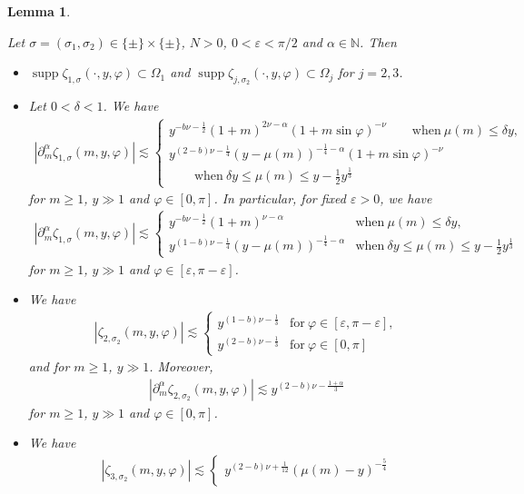 \documentclass[10pt,a4paper]{amsart}
\numberwithin{equation}{section}
\newtheorem{Lemma}[Theorem]{Lemma}
\def\d{\,\mathrm{d}}%
\DeclareMathOperator{\supp}{supp}%
\def\a{\alpha}
\def\d{\delta}
\def\e{\varepsilon}
\def\f{\varphi}
\def\m{\mu}
\def\n{\nu}
\def\s{\sigma}
\def\z{\zeta}
\def\pa{\partial}
\begin{document}
\begin{Lemma}\label{ampesti}

Let $\s=(\s_1,\s_2)\in \{\pm\}\times\{\pm\}$, $N>0$, $0<\e<\pi/2$ and $\a\in\mathbb{N}$. Then
\begin{itemize}\itemsep=0pt
\item[$(i)$] $\supp \z_{1,\s}(\cdot,y,\f)\subset \Omega_1$ and $\supp \z_{j,\s_2}(\cdot,y,\f)\subset \Omega_j$ for $j=2,3$.
\item[$(ii)$] Let $0<\d<1$. We have
\begin{align*}
|\pa_{m}^{\a}\z_{1,\s}(m,y,\f)|\lesssim \begin{cases}y^{-b\n-\frac{1}{2}}(1+m)^{2\n-\a}(1+m\sin \f)^{-\n} \qquad \text{when}\  \m(m)\leq \d y, \\
y^{(2-b)\n-\frac{1}{4}} (y-\m(m))^{-\frac{1}{4}-\a}(1+m\sin \f)^{-\n}\\
\qquad\text{when}\  \d y\leq \m(m)\leq y-\frac{1}{2}y^{\frac{1}{3}}
\end{cases}
\end{align*}
for $m\geq 1$, $y\gg 1$ and $\f\in [0,\pi]$. In particular, for fixed $\e>0$, we have
\begin{align*}
|\pa_{m}^{\a}\z_{1,\s}(m,y,\f)|\lesssim \begin{cases}y^{-b\n-\frac{1}{2}}(1+m)^{\n-\a}&  \text{when}\  \m(m)\leq \d y,\\
y^{(1-b)\n-\frac{1}{4}} (y-\m(m))^{-\frac{1}{4}-\a}& \text{when}\  \d y\leq \m(m)\leq y-\frac{1}{2}y^{\frac{1}{3}}
\end{cases}
\end{align*}
for $m\geq 1$, $y\gg 1$ and $\f\in [\e,\pi-\e]$.
\item[$(iii)$] We have
\begin{align*}
|\z_{2,\s_2}(m,y,\f)|\lesssim \begin{cases}y^{(1-b)\n-\frac{1}{3}}& \text{for}\  \f\in [\e,\pi-\e],\\
y^{(2-b)\n-\frac{1}{3}}& \text{for}\  \f\in [0,\pi]
\end{cases}
\end{align*}
and for $m\geq 1$, $y\gg 1$. Moreover,
\begin{align*}
|\pa_{m}^{\a}\z_{2,\s_2}(m,y,\f)|\lesssim y^{(2-b)\n-\frac{1+\a}{3}}
\end{align*}
for $m\geq 1$, $y\gg 1$ and $\f\in [0,\pi]$.
\item[$(iv)$]
We have
\begin{align*}%
|\z_{3,\s_2}(m,y,\f)|\lesssim \begin{cases}y^{(2-b)\n+\frac{1}{12}}(\m(m)-y)^{-\frac{5}{4}}\\

\end{cases}
\end{align*}
\end{itemize}
\end{Lemma}
\end{document}
